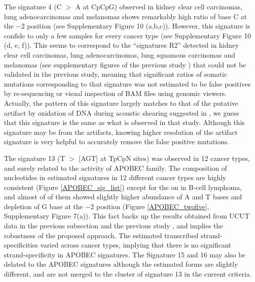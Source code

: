 The signature 4 (C $>$ A at CpCpG) observed in kidney clear cell carcinomas, lung adenocarcinomas and melanomas 
shows remarkably high ratio of base C at the $-2$ position (see Supplementary Figure 10 (a,b,c)).
However, this signature is confide to only a few samples for every cancer type (see Supplementary Figure 10 (d, e, f)).
This seems to correspond to the ``signatures R2''  detected in kidney clear cell carcinomas, lung adenocarcinomas, lung squamous carcinomas and melanomas
(see supplementary figures of the previous study \cite{pmid23318258})
that could not be validated in the previous study,
meaning that significant ratios of somatic mutations corresponding to that signature was not estimated to be false positives by re-sequencing or visual inspection of BAM files using genomic viewers.
Actually, the pattern of this signature largely matches to that of the putative artifact by oxidation of DNA during acoustic shearing suggested in \cite{pmid23303777},
we guess that this signature is the same as what is observed in that study.
Although this signature may be from the artifacts, knowing higher resolution of the artifact signature is very helpful to accurately remove the false positive mutations.


The signature 13 (T $>$ [AGT] at TpCpN sites) was observed in 12 cancer types, and surely related to the activity of APOBEC family.
The composition of nucleotides in estimated signatures in 12 different cancer types are highly consistent (Figure \ref{APOBEC_sig_list}) except for the on in B-cell lymphoma,
and almost of of them showed slightly higher abundance of A and T bases and depletion of G base at the $-2$ position (Figure \ref{APOBEC_twofive}, Supplementary Figure 7(a)).
This fact backs up the results obtained from UCUT data in the previous subsection and the previous study \cite{pmid23318258},
and implies the robustness of the proposed approach.
The estimated transcribed strand-specificities varied across cancer types, implying that there is no significant strand-specificity in APOBEC signatures.
The Signature 15 and 16 may also be delated to the APOBEC signatures although the estimated forms are slightly different,
and are not merged to the cluster of signature 13 in the current criteria.


